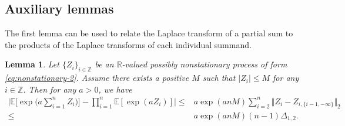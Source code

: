 \documentclass[11pt]{article}
\theoremstyle{plain}
\newtheorem{lemma}[theorem]{Lemma}
\theoremstyle{definition}
\begin{document}
\subsection{Auxiliary lemmas}
The first lemma can be used to relate the Laplace transform of a partial sum to the products of the Laplace transforms of each individual summand.
\begin{lemma}\label{lemma:diff_laplace_joint_marginal}
Let $\{Z_i\}_{i \in \mathbb{Z}}$ be an $\mathbb{R}$-valued possibly nonstationary process of form \eqref{eq:nonstationary-2}. Assume there exists a positive $M$ such that $|Z_i| \leq M$ for any $i \in \mathbb{Z}$. Then for any $a > 0$, we have
\begin{equation*}
\begin{aligned}
    \bigg| \mathbb{E}\Big[\exp\Big(a\sum_{i = 1}^n Z_i \Big) \Big] - \prod_{i = 1}^n \mathbb{E}[\exp(aZ_i)] \bigg| \leq& a\exp(anM)\sum_{i = 2}^n\Vert Z_i - Z_{i, \{i-1, -\infty\}} \Vert_2\\
    \leq& a\exp(anM)(n-1) \Delta_{1,2}.
\end{aligned}
\end{equation*}
\end{lemma}
\end{document}
